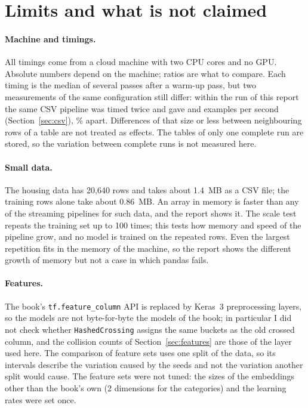 \section{Limits and what is not claimed}
\label{sec:limits}

\paragraph{Machine and timings.} All timings come from a cloud machine with two CPU cores and no GPU. Absolute numbers depend on the machine; ratios are what to compare. Each timing is the median of several passes after a warm-up pass, but two measurements of the same configuration still differ: within the run of this report the same CSV pipeline was timed twice and gave  and  examples per second (Section~\ref{sec:csv}), \% apart. Differences of that size or less between neighbouring rows of a table are not treated as effects. The tables of only one complete run are stored, so the variation between complete runs is not measured here.

\paragraph{Small data.} The housing data has 20,640 rows and takes about 1.4~MB as a CSV file; the training rows alone take about 0.86~MB. An array in memory is faster than any of the streaming pipelines for such data, and the report shows it. The scale test repeats the training set up to 100 times; this tests how memory and speed of the pipeline grow, and no model is trained on the repeated rows. Even the largest repetition fits in the memory of the machine, so the report shows the different growth of memory but not a case in which pandas fails.

\paragraph{Features.} The book's \texttt{tf.feature\_column} API is replaced by Keras~3 preprocessing layers, so the models are not byte-for-byte the models of the book; in particular I did not check whether \texttt{HashedCrossing} assigns the same buckets as the old crossed column, and the collision counts of Section~\ref{sec:features} are those of the layer used here. The comparison of feature sets uses one split of the data, so its intervals describe the variation caused by the seeds and not the variation another split would cause. The feature sets were not tuned: the sizes of the embeddings other than the book's own (2 dimensions for the categories) and the learning rates were set once.


